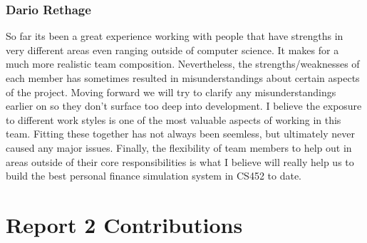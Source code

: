 \subsubsection{Dario Rethage}
So far its been a great experience working with people that have strengths in very different areas even ranging outside of computer science. It makes for a much more realistic team composition. Nevertheless, the strengths/weaknesses of each member has sometimes resulted in misunderstandings about certain aspects of the project. Moving forward we will try to clarify any misunderstandings earlier on so they don't surface too deep into development. I believe the exposure to different work styles is one of the most valuable aspects of working in this team. Fitting these together has not always been seemless, but ultimately never caused any major issues. Finally, the flexibility of team members to help out in areas outside of their core responsibilities is what I believe will really help us to build the best personal finance simulation system in CS452 to date. \\



\section{Report 2 Contributions}
